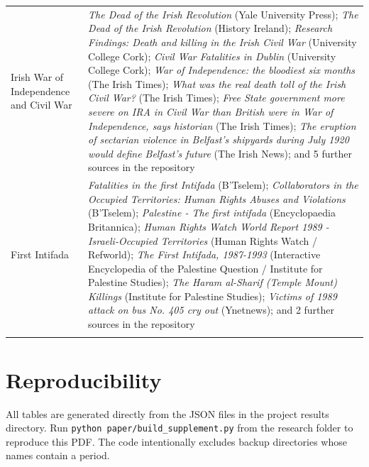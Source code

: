 \documentclass[11pt]{article}
\begin{document}
\begin{scriptsize}
\begin{longtable}{p{3.5cm} p{12.5cm}}
Irish War of Independence and Civil War & \emph{The Dead of the Irish Revolution} (Yale University Press); \emph{The Dead of the Irish Revolution} (History Ireland); \emph{Research Findings: Death and killing in the Irish Civil War} (University College Cork); \emph{Civil War Fatalities in Dublin} (University College Cork); \emph{War of Independence: the bloodiest six months} (The Irish Times); \emph{What was the real death toll of the Irish Civil War?} (The Irish Times); \emph{Free State government more severe on IRA in Civil War than British were in War of Independence, says historian} (The Irish Times); \emph{The eruption of sectarian violence in Belfast's shipyards during July 1920 would define Belfast's future} (The Irish News); and 5 further sources in the repository \\
\addlinespace
First Intifada & \emph{Fatalities in the first Intifada} (B'Tselem); \emph{Collaborators in the Occupied Territories: Human Rights Abuses and Violations} (B'Tselem); \emph{Palestine - The first intifada} (Encyclopaedia Britannica); \emph{Human Rights Watch World Report 1989 - Israeli-Occupied Territories} (Human Rights Watch / Refworld); \emph{The First Intifada, 1987-1993} (Interactive Encyclopedia of the Palestine Question / Institute for Palestine Studies); \emph{The Haram al-Sharif (Temple Mount) Killings} (Institute for Palestine Studies); \emph{Victims of 1989 attack on bus No. 405 cry out} (Ynetnews); and 2 further sources in the repository \\
\addlinespace
\bottomrule
\end{longtable}
\end{scriptsize}
\section{Reproducibility}
All tables are generated directly from the JSON files in the project results directory. Run \texttt{python paper/build\_supplement.py} from the research folder to reproduce this PDF. The code intentionally excludes backup directories whose names contain a period.
\end{document}
